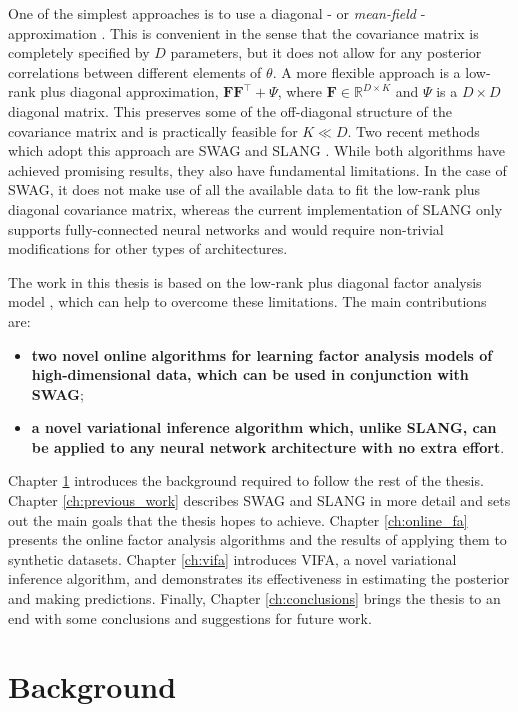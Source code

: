 \documentclass[msc,deptreport.inf]{infthesis} %
\newcommand{\matr}[1]{\mathbf{#1}}
\newcommand{\R}{\mathbb R}
\begin{document}
One of the simplest approaches is to use a diagonal - or \emph{mean-field} - approximation \cite{blundell2015, graves2011, hernandez2015, tangkaratt2018, ranganath2014}. This is convenient in the sense that the covariance matrix is completely specified by $D$ parameters, but it does not allow for any posterior correlations between different elements of $\theta$. A more flexible approach is a low-rank plus diagonal approximation, $\matr{F}\matr{F}^\intercal + \Psi$, where $\matr{F} \in \R^{D\times K}$ and $\Psi$ is a $D \times D$ diagonal matrix. This preserves some of the off-diagonal structure of the covariance matrix and is practically feasible for $K \ll D$. Two recent methods which adopt this approach are SWAG \cite{maddox2019} and SLANG \cite{mishkin2018}. While both algorithms have achieved promising results, they also have fundamental limitations. In the case of SWAG, it does not make use of all the available data to fit the low-rank plus diagonal covariance matrix, whereas the current implementation of SLANG only supports fully-connected neural networks and would require non-trivial modifications for other types of architectures.

The work in this thesis is based on the low-rank plus diagonal factor analysis model \cite{barber2007}, which can help to overcome these limitations. The main contributions are:
\begin{itemize}
	\item \textbf{two novel online algorithms for learning factor analysis models of high-dimensional data, which can be used in conjunction with SWAG};
	\item \textbf{a novel variational inference algorithm which, unlike SLANG, can be applied to any neural network architecture with no extra effort}. 
\end{itemize} 

Chapter \ref{ch:background} introduces the background required to follow the rest of the thesis. Chapter \ref{ch:previous_work} describes SWAG and SLANG in more detail and sets out the main goals that the thesis hopes to achieve. Chapter \ref{ch:online_fa} presents the online factor analysis algorithms and the results of applying them to synthetic datasets. Chapter \ref{ch:vifa} introduces VIFA, a novel variational inference algorithm, and demonstrates its effectiveness in estimating the posterior and making predictions. Finally, Chapter \ref{ch:conclusions} brings the thesis to an end with some conclusions and suggestions for future work. 


\chapter{Background}\label{ch:background}
\end{document}

